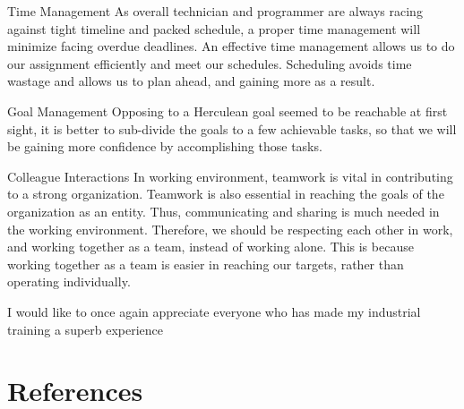 \documentclass[12pt,a4paper]{report}
\begin{document}
Time Management
As overall technician and programmer are always racing against tight timeline and packed schedule, a proper time management will minimize facing overdue deadlines. An effective time management allows us to do our assignment efficiently and meet our schedules. Scheduling avoids time wastage and allows us to plan ahead, and gaining more as a result. 

Goal Management
Opposing to a Herculean goal seemed to be reachable at first sight, it is better to sub-divide the goals to a few achievable tasks, so that we will be gaining more confidence by accomplishing those tasks. 

Colleague Interactions
In working environment, teamwork is vital in contributing to a strong organization. Teamwork is also essential in reaching the goals of the organization as an entity. Thus, communicating and sharing is much needed in the working environment. Therefore, we should be respecting each other in work, and working together as a team, instead of working alone. This is because working together as a team is easier in reaching our targets, rather than operating individually. 

I would like to once again appreciate everyone who has made my industrial training a superb experience

\chapter{\textbf{References}}
\end{document}
